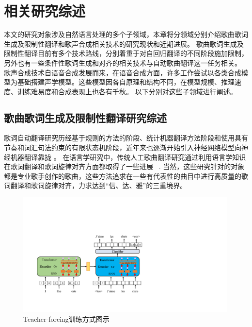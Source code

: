 \chapter{相关研究综述}
本文的研究对象涉及自然语言处理的多个子领域，本章将分领域分别介绍歌曲歌词生成及限制性翻译和歌声合成相关技术的研究现状和近期进展。
歌曲歌词生成及限制性翻译目前有多个技术路线，分别着重于对自回归翻译的不同阶段施加限制，另外也有一些条件性歌词生成和对齐的相关技术与自动歌曲翻译这一任务相关。
歌声合成技术自语音合成发展而来，在语音合成方面，许多工作尝试以各类合成模型为基础搭建声学模型。这些模型因各自原理和结构不同，在模型规模、推理速度、训练难易度和合成表现上也各有千秋。
以下分别对这些子领域进行阐述。
\section{歌曲歌词生成及限制性翻译研究综述}
\label{sec:seq2seq}
歌词自动翻译研究历经基于规则的方法的阶段、统计机器翻译方法阶段和使用具有节奏和词汇句法约束的有限状态机阶段\citep{spanish_verse, Manurung2004AnEA, He_Zhou_Jiang_2012}，近年来也逐渐开始引入神经网络模型向神经机器翻译靠拢
\citep{ghazvininejad-etal-2016-generating,ghazvininejad-etal-2017-hafez, ghazvininejad-etal-2018-neural}。
在语言学研究中，传统人工歌曲翻译研究通过利用语言学知识在歌词翻译和歌词旋律对齐方面都取得了一些进展
~\citep{interplay_lyrics_melody,low_2003,low2008translating,low_2022,three_d_of_singability,trans_of_music}.
当然，这些研究针对的对象都是专业歌手创作的歌曲，这些方法追求在一些有代表性的曲目中进行高质量的歌词翻译和歌词旋律对齐，力求达到``信、达、雅''的三重境界。
\begin{figure}[ht]
  \centering
  \includegraphics[width=0.99\textwidth]{figure/related/teacher-forcing.pdf}
  \caption{Teacher-forcing训练方式图示}
  \label{fig:tf_train}
\end{figure}
